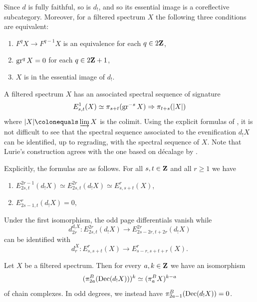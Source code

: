 \documentclass[oneside,a4paper]{amsart}
\begin{document}
\begin{recollection}
Since $d$ is fully faithful, so is $d_{!}$, and so its essential image is a coreflective subcategory. Moreover, for a filtered spectrum $X$ the following three conditions are equivalent: 
\begin{enumerate}
    \item $F^{q} X \rightarrow F^{q-1} X$ is an equivalence for each $q \in 2 \mathbf{Z}$, 
    \item $\operatorname{gr}^{q} X = 0$ for each $q \in 2 \mathbf{Z} + 1$, 
    \item $X$ is in the essential image of $d_{!}$. 
\end{enumerate} 
\end{recollection}

\begin{remark}
\label{remark:spectral_sequence_of_evenification}
A filtered spectrum $X$ has an associated spectral sequence of signature
\[
E^{1}_{s, t}(X) \simeq \pi_{s+t}(\operatorname{gr}^{-s} X) \Rightarrow \pi_{t+s}(| X |)
\]
where $| X | \colonequals \varinjlim X$ is the colimit. Using the explicit formulas of \cite[{Construction 1.2.2.6}]{HA}, it is not difficult to see that the spectral sequence associated to the evenification $d_{!}X$ can be identified, up to regrading, with the spectral sequence of $X$. Note that Lurie's construction agrees with the one based on d\'{e}calage by \cite[{Remark 4.15}]{antieau:decalage}. 

Explicitly, the formulas are as follows. For all $s, t \in \mathbf{Z}$ and all $r \geq 1$ we have 
\begin{enumerate}
    \item $E^{2r-1}_{2s, t}(d_{!}X) \simeq E^{2r}_{2s, t}(d_{!} X) \simeq E^{r}_{s, s+t}(X)$, 
    \item $E^{r}_{2s-1, t}(d_{!}X) = 0$, 
\end{enumerate}
Under the first isomorphism, the odd page differentials vanish while 
\[
d_{2r}^{d_{!}X} \colon E^{2r}_{2s, t}(d_{!}X) \rightarrow E^{2r}_{2s-2r, t+2r}(d_{!}X)
\]
can be identified with 
\[
d_{r}^{X} \colon E^{r}_{s, s+t}(X) \rightarrow E^{r}_{s-r, s+t+r}(X). 
\]
\end{remark}

\begin{lemma}
\label{lemma:homotopy_of_decalage_of_evenification}
Let $X$ be a filtered spectrum. Then for every $a, k \in \mathbf{Z}$ we have an isomorphism 
\[
(\pi^{B}_{2a} (\mathrm{Dec}(d_{!}X)))^{k} \simeq (\pi^{B}_{a} X)^{k-a}
\]
of chain complexes. In odd degrees, we instead have $\pi^{B}_{2a-1}(\mathrm{Dec}(d_{!}X)) = 0$. 
\end{lemma}
\end{document}

